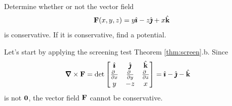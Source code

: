 \begin{eg}\label{eg:potentialC}
Determine whether or not the vector field
\begin{equation*}
\mathbf{F}(x,y,z) = y\hat{\pmb{\imath}} -z\hat{\pmb{\jmath}} +x\hat{\mathbf{k}}
\end{equation*}
is conservative. If it is conservative, find a potential.

\soln
Let's start by applying the screening test Theorem \ref{thm:screen}.b.
Since
\begin{align*}
\vnabla\times\vF
&=\det\left[\begin{matrix}
                \hi &\hj & \hk \\
                \frac{\partial\ }{\partial x} & \frac{\partial\ }{\partial y}
                      & \frac{\partial\ }{\partial z} \\
                y & -z & x
            \end{matrix}\right]
=\hi-\hj-\hk
\end{align*}
is not $\mathbf{0}$, the vector field $\mathbf{F}$ cannot be conservative.
\end{eg}


